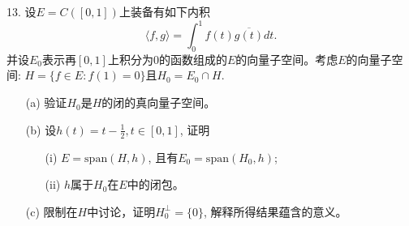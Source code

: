\documentclass[a4paper,8pt]{ctexart}\textwidth 140mm \textheight 216mm
\newcommand{\8}{\infty}
\newcommand{\la}{\langle}
\newcommand{\ra}{\rangle}
\begin{document}


13. 设$E=C([0,1])$上装备有如下内积
\begin{equation*}
\la f,g\ra=\int_0^1 f(t)\overline{g(t)}dt.
\end{equation*}
并设$E_0$表示再$[0,1]$上积分为$0$的函数组成的$E$的向量子空间。考虑$E$的向量子空间: $H=\{f\in E:f(1)=0\}$且$H_0=E_0\cap H$.
\begin{enumerate}
	\item[(a)] 验证$H_0$是$H$的闭的真向量子空间。
	\item[(b)] 设$h(t)=t-\frac{1}{2},t\in[0,1]$, 证明
	\begin{enumerate}
		\item[(i)] $E=\mathrm{span}(H,h)$, 且有$E_0=\mathrm{span}(H_0,h)$;
		\item[(ii)] $h$属于$H_0$在$E$中的闭包。
	\end{enumerate}
	\item[(c)] 限制在$H$中讨论，证明$H_0^{\perp}=\{0\}$, 解释所得结果蕴含的意义。
\end{enumerate}
\end{document}
